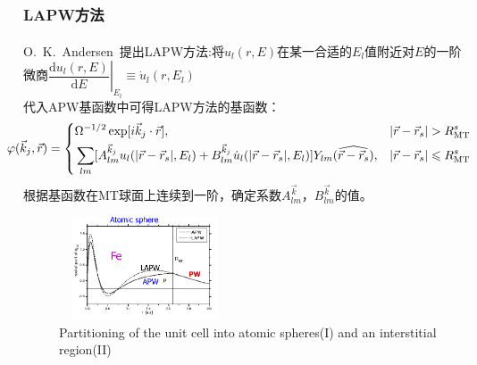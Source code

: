 \documentclass[cjk,slidestop,compress,mathserif,blue]{beamer}
\newcommand{\upcite}[1]{\hspace{0ex}\textsuperscript{\cite{#1}}} %
\begin{document}
\frame
{
\frametitle{\textrm{LAPW}方法}
\textrm{O.~K.~Andersen~}提出\textrm{LAPW}方法\upcite{Singh_Book}:将$u_l(r,E)$在某一合适的$E_l$值附近对$E$的一阶微商{$\left.\dfrac{\textrm{d}u_l(r,E)}{\textrm{d}E}\right|_{E_l}\equiv\dot u_l(r,E_l)$}\\代入\textrm{APW}基函数中可得\textrm{LAPW}方法的基函数：
{\fontsize{7.5pt}{3.3pt}\selectfont
$${\hskip -14pt \varphi(\vec k_j,\vec r)=\left\{
  \begin{aligned}
    &\Omega^{-1/2}\exp[i\vec k_j\cdot\vec r],&|\vec r-\vec r_s|>R_{\mathrm{MT}}^s\\
    &\sum_{lm}[A^{\vec k_j}_{lm}u_l(|\vec r-\vec r_s|,E_l)+B^{\vec k_j}_{lm}\dot u_l(|\vec r-\vec r_s|,E_l)]Y_{lm}(\widehat{\vec r-\vec r_s}),&|\vec r-\vec r_s|\leqslant R_{\mathrm{MT}}^s
  \end{aligned}
\right.}$$}
根据基函数在\textrm{MT}球面上连续到一阶，确定系数$A^{\vec k}_{lm}$，$B^{\vec k}_{lm}$的值。
\begin{figure}[h!]
\centering
\includegraphics[height=1.20in,width=1.98in,viewport=1 20 585 435,clip]{Figures/WIEN2k-LAPW.png}
\caption{\tiny \textrm{Partitioning of the unit cell into atomic spheres(I) and an interstitial region(II)}}%
\label{Muffin_tin-3}
\end{figure}
}
\end{document}
